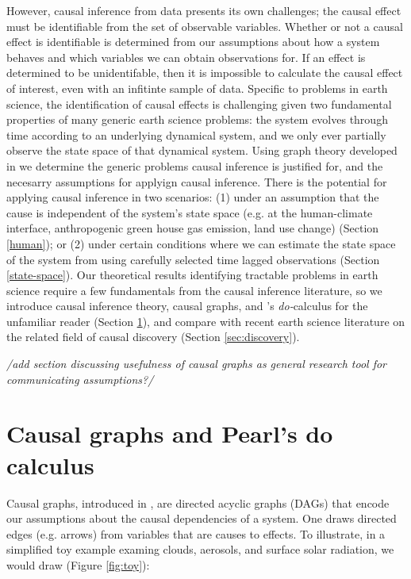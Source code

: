 \documentclass[12pt]{article}
\begin{document}

However, causal inference from data presents its own challenges; the
causal effect must be identifiable from the set of observable
variables. Whether or not a causal effect is identifiable is
determined from our assumptions about how a system behaves and which
variables we can obtain observations for. If an effect is determined
to be unidentifable, then it is impossible to calculate the causal
effect of interest, even with an infitinte sample of data. Specific to
problems in earth science, the identification of causal effects is
challenging given two fundamental properties of many generic earth
science problems: the system evolves through time according to an
underlying dynamical system, and we only ever partially observe the
state space of that dynamical system. Using graph theory developed in
\citep{pearl1995causal} we determine the generic problems causal
inference is justified for, and the necesarry assumptions for applyign
causal inference. There is the potential for applying causal inference
in two scenarios: (1) under an assumption that the cause is
independent of the system's state space (e.g. at the human-climate
interface, anthropogenic green house gas emission, land use change)
(Section \ref{human}); or (2) under certain conditions where we can
estimate the state space of the system from using carefully selected
time lagged observations (Section \ref{state-space}).  Our theoretical
results identifying tractable problems in earth science require a few
fundamentals from the causal inference literature, so we introduce
causal inference theory, causal graphs, and \citet{pearl2009}'s
\textit{do-}calculus for the unfamiliar reader (Section
\ref{sec:causal-graphs-pearls}), and compare with recent earth science
literature on the related field of causal discovery (Section
\ref{sec:discovery}).

\textit{/add section discussing usefulness of causal graphs as general
  research tool for communicating assumptions?/}

\section{Causal graphs and Pearl's do calculus}
\label{sec:causal-graphs-pearls}

Causal graphs, introduced in \citep{pearl1995causal}, are directed
acyclic graphs (DAGs) that encode our assumptions about the causal
dependencies of a system. One draws directed edges (e.g. arrows)
from variables that are causes to effects. To illustrate, in a
simplified toy example examing clouds, aerosols, and surface solar
radiation, we would draw (Figure \ref{fig:toy}):
\end{document}
